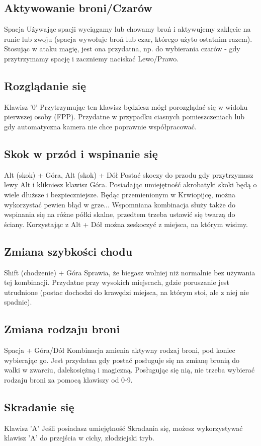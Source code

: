 \documentclass[11pt,polish, openany]{book}
\begin{document}
\subsection{Aktywowanie broni/Czarów}
Spacja
Używając spacji wyciągamy lub chowamy broń i aktywujemy zaklęcie na runie lub zwoju (spacja wywołuje broń lub czar, którego użyto ostatnim razem). Stosując w ataku magię, jest ona przydatna, np. do wybierania czarów - gdy przytrzymamy spację i zaczniemy naciskać Lewo/Prawo.
\subsection{Rozglądanie się}
Klawisz '0'
Przytrzymując ten klawisz będziesz mógł porozglądać się w widoku pierwszej osoby (FPP). Przydatne w przypadku ciasnych pomieszczeniach lub gdy automatyczna kamera nie chce poprawnie współpracować.
\subsection{Skok w przód i wspinanie się}
Alt (skok) + Góra, Alt (skok) + Dół
Postać skoczy do przodu gdy przytrzymasz lewy Alt i klikniesz klawisz Góra. Posiadając umiejętność akrobatyki skoki będą o wiele dłuższe i bezpieczniejsze. Będąc przemienionym w Krwiopijcę, można wykorzystać pewien błąd w grze... Wspomniana kombinacja służy także do wspinania się na różne półki skalne, przedtem trzeba ustawić się twarzą do ściany. Korzystając z Alt + Dół można zeskoczyć z miejsca, na którym wisimy.
\subsection{Zmiana szybkości chodu}
Shift (chodzenie) + Góra
Sprawia, że biegasz wolniej niż normalnie bez używania tej kombinacji. Przydatne przy wysokich miejscach, gdzie poruszanie jest utrudnione (postac dochodzi do krawędzi miejsca, na którym stoi, ale z niej nie spadnie).
\subsection{Zmiana rodzaju broni}
Spacja + Góra/Dół
Kombinacja zmienia aktywny rodzaj broni, pod koniec wybierając go. Jest przydatna gdy postać posługuje się na zmianę bronią do walki w zwarciu, dalekosiężną i magiczną. Posługując się nią, nie trzeba wybierać rodzaju broni za pomocą klawiszy od 0-9.
\subsection{Skradanie się}
Klawisz 'A'
Jeśli posiadasz umiejętność Skradania się, możesz wykorzystywać klawisz 'A' do przejścia w cichy, złodziejski tryb.
\end{document}
